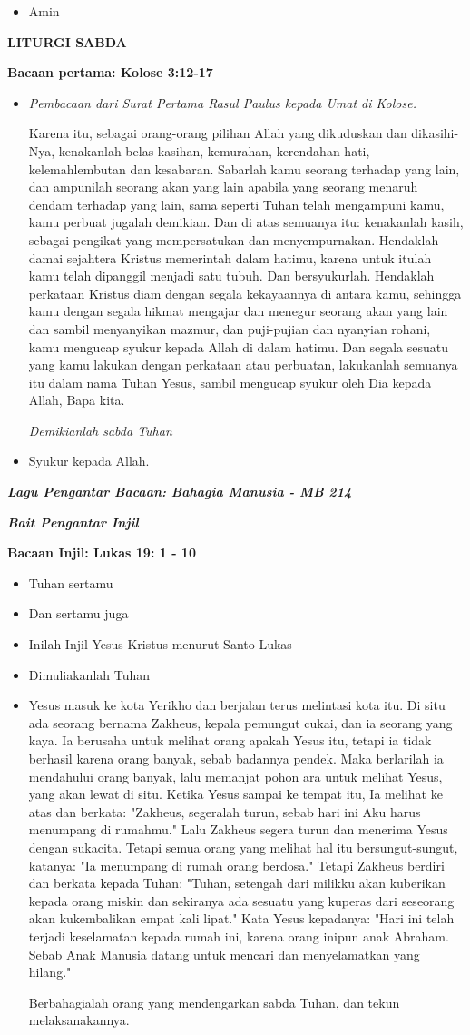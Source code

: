 \documentclass[12pt]{book}
\makeatletter
\newcommand{\judul}[1]{%
  {\parindent \z@ \centering \normalfont
    \interlinepenalty\@M \Large \bfseries #1\par\nobreak \vskip 20\p@ }}
\newcommand{\subjudul}[1]{%
  {\parindent \z@ \normalfont
    \interlinepenalty\@M \bfseries #1\par\nobreak \vskip 20\p@ }}
\newcommand{\lagu}[1]{%
  {\parindent \z@ \normalfont
    \interlinepenalty\@M \bfseries \emph{#1}\par\nobreak \vskip 20\p@ }}
\newcommand{\BU}[1]{\begin{itemize} \item[U:] #1 \end{itemize}}
\newcommand{\BI}[1]{\begin{itemize} \item[I:] #1 \end{itemize}}
\newcommand{\BP}[1]{\begin{itemize} \item[P:] #1 \end{itemize}}
\makeatother
\begin{document}
\BU{Amin}

\judul{LITURGI SABDA}

\subjudul{Bacaan pertama: Kolose 3:12-17}

\BP{\emph{Pembacaan dari Surat Pertama Rasul Paulus kepada Umat di Kolose.}

Karena itu, sebagai orang-orang pilihan Allah yang dikuduskan dan dikasihi-Nya, kenakanlah belas kasihan, kemurahan, kerendahan hati, kelemahlembutan dan kesabaran.
Sabarlah kamu seorang terhadap yang lain, dan ampunilah seorang akan yang lain apabila yang seorang menaruh dendam terhadap yang lain, sama seperti Tuhan telah mengampuni kamu, kamu perbuat jugalah demikian.
Dan di atas semuanya itu: kenakanlah kasih, sebagai pengikat yang mempersatukan dan menyempurnakan.
Hendaklah damai sejahtera Kristus memerintah dalam hatimu, karena untuk itulah kamu telah dipanggil menjadi satu tubuh. Dan bersyukurlah.
Hendaklah perkataan Kristus diam dengan segala kekayaannya di antara kamu, sehingga kamu dengan segala hikmat mengajar dan menegur seorang akan yang lain dan sambil menyanyikan mazmur, dan puji-pujian dan nyanyian rohani, kamu mengucap syukur kepada Allah di dalam hatimu.
Dan segala sesuatu yang kamu lakukan dengan perkataan atau perbuatan, lakukanlah semuanya itu dalam nama Tuhan Yesus, sambil mengucap syukur oleh Dia kepada Allah, Bapa kita.

\emph{Demikianlah sabda Tuhan}
}

\BU{Syukur kepada Allah.}

\lagu{Lagu Pengantar Bacaan: Bahagia Manusia - MB 214}

\lagu{Bait Pengantar Injil}

\subjudul{Bacaan Injil: Lukas 19: 1 - 10}

\BI{Tuhan sertamu}

\BU{Dan sertamu juga}

\BI{Inilah Injil Yesus Kristus menurut Santo Lukas}

\BU{Dimuliakanlah Tuhan}

\BI{
Yesus masuk ke kota Yerikho dan berjalan terus melintasi kota itu.
Di situ ada seorang bernama Zakheus, kepala pemungut cukai, dan ia seorang yang kaya.
Ia berusaha untuk melihat orang apakah Yesus itu, tetapi ia tidak berhasil karena orang banyak, sebab badannya pendek.
Maka berlarilah ia mendahului orang banyak, lalu memanjat pohon ara untuk melihat Yesus, yang akan lewat di situ.
Ketika Yesus sampai ke tempat itu, Ia melihat ke atas dan berkata: "Zakheus, segeralah turun, sebab hari ini Aku harus menumpang di rumahmu."
Lalu Zakheus segera turun dan menerima Yesus dengan sukacita.
Tetapi semua orang yang melihat hal itu bersungut-sungut, katanya: "Ia menumpang di rumah orang berdosa."
Tetapi Zakheus berdiri dan berkata kepada Tuhan: "Tuhan, setengah dari milikku akan kuberikan kepada orang miskin dan sekiranya ada sesuatu yang kuperas dari seseorang akan kukembalikan empat kali lipat."
Kata Yesus kepadanya: "Hari ini telah terjadi keselamatan kepada rumah ini, karena orang inipun anak Abraham.
Sebab Anak Manusia datang untuk mencari dan menyelamatkan yang hilang."

Berbahagialah orang yang mendengarkan sabda Tuhan, dan tekun melaksanakannya.}
\end{document}
